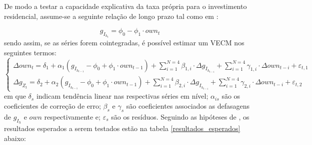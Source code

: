 De modo a testar a capacidade explicativa da taxa própria para o investimento residencial, assume-se a seguinte relação de longo prazo tal como em \textcite{teixeira_crescimento_2015}:

\begin{equation}
g_{I_{h_t}} = \phi_0 - \phi_1\cdot own_t
\end{equation}
sendo assim, se as séries forem cointegradas, é possível estimar um VECM nos seguintes termos:
\begin{equation}
\begin{cases}
\Delta own_t = \delta_{1} + \alpha_1(g_{I_{h_{t-1}}} - \phi_0 + \phi_1\cdot own_{t-1}) + \sum^{N=4}_{i=1}\beta_{1,i}\cdot \Delta g_{I_{h_{t-i}}} +
\sum^{N=4}_{i=1}\gamma_{1,i}\cdot \Delta own_{t-i} +\varepsilon_{t,1}
\\
\Delta g_{Z_{t}} = \delta_{2} + \alpha_2(g_{I_{h_{t-1}}} - \phi_0 + \phi_1\cdot own_{t-1}) + \sum^{N=4}_{i=1}\beta_{2,i}\cdot \Delta g_{I_{h_{t-i}}} +
\sum^{N=4}_{i=1}\gamma_{2,i}\cdot \Delta own_{t-i} +\varepsilon_{t,2}
\end{cases}
\end{equation}
em que $\delta_s$ indicam tendência linear nas respectivas séries em nível;
$\alpha_{is}$ são os coeficientes de correção de erro; 
$\beta_s$ e $\gamma_s$ são coeficientes associados as defasagens de  $g_{I_h}$ e $own$ respectivamente e; $\varepsilon_s$ são os resíduos.
Seguindo as hipóteses de \textcite{teixeira_crescimento_2015}, os resultados esperados a serem testados estão na tabela \ref{resultados_esperados} abaixo:


